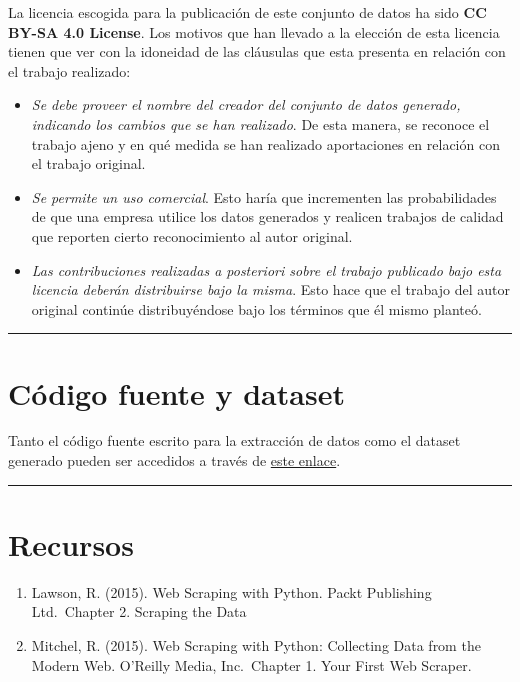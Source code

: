 \documentclass[]{article}
\providecommand{\tightlist}{%
  \setlength{\itemsep}{0pt}\setlength{\parskip}{0pt}}
\begin{document}
La licencia escogida para la publicación de este conjunto de datos ha
sido \textbf{CC BY-SA 4.0 License}. Los motivos que han llevado a la
elección de esta licencia tienen que ver con la idoneidad de las
cláusulas que esta presenta en relación con el trabajo realizado:

\begin{itemize}
\item
  \emph{Se debe proveer el nombre del creador del conjunto de datos
  generado, indicando los cambios que se han realizado}. De esta manera,
  se reconoce el trabajo ajeno y en qué medida se han realizado
  aportaciones en relación con el trabajo original.
\item
  \emph{Se permite un uso comercial}. Esto haría que incrementen las
  probabilidades de que una empresa utilice los datos generados y
  realicen trabajos de calidad que reporten cierto reconocimiento al
  autor original.
\item
  \emph{Las contribuciones realizadas a posteriori sobre el trabajo
  publicado bajo esta licencia deberán distribuirse bajo la misma}. Esto
  hace que el trabajo del autor original continúe distribuyéndose bajo
  los términos que él mismo planteó.
\end{itemize}

\begin{center}\rule{0.5\linewidth}{0.5pt}\end{center}

\hypertarget{cuxf3digo-fuente-y-dataset}{%
\section{Código fuente y dataset}\label{cuxf3digo-fuente-y-dataset}}

Tanto el código fuente escrito para la extracción de datos como el
dataset generado pueden ser accedidos a través de
\href{https://github.com/tteguayco/Web-scraping}{este enlace}.

\begin{center}\rule{0.5\linewidth}{0.5pt}\end{center}

\hypertarget{recursos}{%
\section{Recursos}\label{recursos}}

\begin{enumerate}
\def\labelenumi{\arabic{enumi}.}
\tightlist
\item
  Lawson, R. (2015). Web Scraping with Python. Packt Publishing
  Ltd.~Chapter 2. Scraping the Data\\
\item
  Mitchel, R. (2015). Web Scraping with Python: Collecting Data from the
  Modern Web. O'Reilly Media, Inc.~Chapter 1. Your First Web Scraper.
\end{enumerate}
\end{document}
